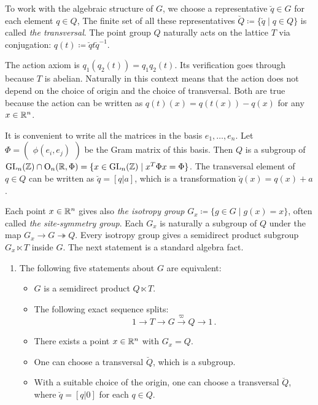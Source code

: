 To work with the algebraic structure of $G$,
we choose a representative $\breve{q}\in G$
for each element $q\in Q$, 
The finite set of all these representatives $\breve{Q} \coloneqq \{ \breve{q}\mid q\in Q\}$ is called {\em the transversal}.
The point group $Q$ naturally acts on the lattice $T$ via conjugation: $q(t) \coloneqq \breve{q}t\breve{q}^{-1}$.

\begin{just}
  The action axiom is $q_1(q_2 (t)) = q_1q_2 (t)$. Its verification goes through because $T$ is abelian.
  Naturally in this context means that the action does not depend on the choice of origin and the choice of transversal.
  Both are true because the action can be written
as $q(t)(x) = q(t(x)) - q(x)$ for any $x\in {\mathbb R}^n$.
\end{just}  

It is convenient to write all the matrices in the basis $e_1, \ldots, e_n$.
Let $\Phi = \begin{pmatrix}\phi (e_i,e_j)\end{pmatrix}$ be the Gram  matrix of this basis.
Then $Q$ is a subgroup of $\operatorname{GL}_n ({\mathbb Z})\cap \mathrm{O}_n ({\mathbb R}, \Phi) = \{ x\in \operatorname{GL}_n ({\mathbb Z}) \mid x^{T}\Phi x=\Phi\}$.
The transversal element of $q\in Q$ can be written as $\breve{q} = [q|a]$, which is
a transformation $\breve{q} (x) = q(x) + a$. 


Each point $x\in {\mathbb R}^n$ gives also {\em the isotropy group} $G_x \coloneqq \{ g\in G \mid g(x) = x\}$, often called {\em the site-symmetry group}.
Each $G_x$ is naturally a subgroup of $Q$ under the map $G_x \to G \twoheadrightarrow Q$. Every isotropy group gives a semidirect product subgroup
$G_x \ltimes T$ inside $G$. The next statement is a standard algebra fact.
\begin{enumerate}[resume, label=\textnormal{(\Roman*)}]
\item The following five statements about $G$ are equivalent:
  \begin{itemize}
\item   $G$ is a semidirect product $Q\ltimes T$.
\item  The following exact sequence splits:
  \begin{equation} \label{sequence:TGQ}
    1\to T\to G \xrightarrow{\varpi} Q \to 1 \, .
    \end{equation}
\item  There exists a point $x\in {\mathbb R}^n$ with $G_x=Q$.
\item One can choose a transversal $\breve{Q}$, which is a subgroup. 
\item With a suitable choice of the origin, one can choose a transversal $\breve{Q}$, where $\breve{q} = [q|0]$ for each $q\in Q$. 
\end{itemize}
  \end{enumerate}

